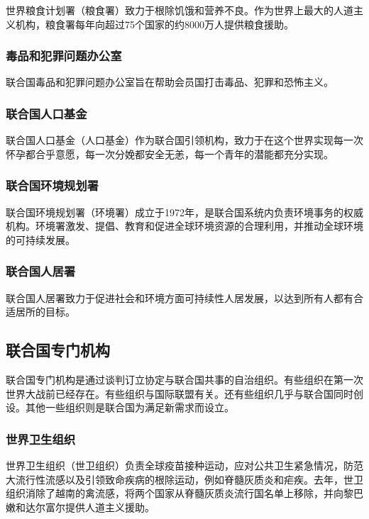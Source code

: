 \documentclass[a4paper,openany]{book}
\begin{document}
世界粮食计划署（粮食署）致力于根除饥饿和营养不良。作为世界上最大的人道主义机构，粮食署每年向超过75个国家的约8000万人提供粮食援助。

\subsubsection{毒品和犯罪问题办公室}

联合国毒品和犯罪问题办公室旨在帮助会员国打击毒品、犯罪和恐怖主义。

\subsubsection{联合国人口基金}

联合国人口基金（人口基金）作为联合国引领机构，致力于在这个世界实现每一次怀孕都合乎意愿，每一次分娩都安全无恙，每一个青年的潜能都充分实现。

\subsubsection{联合国环境规划署}

联合国环境规划署（环境署）成立于1972年，是联合国系统内负责环境事务的权威机构。环境署激发、提倡、教育和促进全球环境资源的合理利用，并推动全球环境的可持续发展。

\subsubsection{联合国人居署}

联合国人居署致力于促进社会和环境方面可持续性人居发展，以达到所有人都有合适居所的目标。

\subsection{联合国专门机构}

联合国专门机构是通过谈判订立协定与联合国共事的自治组织。有些组织在第一次世界大战前已经存在。有些组织与国际联盟有关。还有些组织几乎与联合国同时创设。其他一些组织则是联合国为满足新需求而设立。

\subsubsection{世界卫生组织}
世界卫生组织（世卫组织）负责全球疫苗接种运动，应对公共卫生紧急情况，防范大流行性流感以及引领致命疾病的根除运动，例如脊髓灰质炎和疟疾。去年，世卫组织消除了越南的禽流感，将两个国家从脊髓灰质炎流行国名单上移除，并向黎巴嫩和达尔富尔提供人道主义援助。
\end{document}
